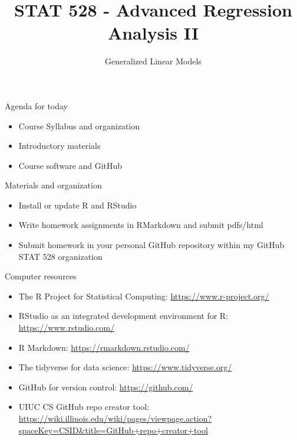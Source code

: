 \documentclass[
  ignorenonframetext,
]{beamer}
\title{STAT 528 - Advanced Regression Analysis II}
\author{Generalized Linear Models}
\date{}
\institute{Daniel J. Eck\\
Department of Statistics\\
University of Illinois}
\providecommand{\tightlist}{%
  \setlength{\itemsep}{0pt}\setlength{\parskip}{0pt}}
\begin{document}
\frame{\titlepage}

\begin{frame}
\newcommand{\R}{\mathbb{R}}
\newcommand{\Prob}{\mathbb{P}}
\newcommand{\Proj}{\textbf{P}}
\newcommand{\Hcal}{\mathcal{H}}
\newcommand{\rootn}{\sqrt{n}}
\newcommand{\p}{\mathbf{p}}
\newcommand{\E}{\text{E}}
\newcommand{\Var}{\text{Var}}
\newcommand{\Cov}{\text{Cov}}
\end{frame}

\begin{frame}{Agenda for today}
\protect\hypertarget{agenda-for-today}{}
\begin{itemize}
\tightlist
\item
  Course Syllabus and organization
\item
  Introductory materials
\item
  Course software and GitHub
\end{itemize}
\end{frame}

\begin{frame}{Materials and organization}
\protect\hypertarget{materials-and-organization}{}
\begin{itemize}
\tightlist
\item
  Install or update R and RStudio
\item
  Write homework assignments in RMarkdown and submit pdfs/html
\item
  Submit homework in your personal GitHub repository within my GitHub
  STAT 528 organization
\end{itemize}
\end{frame}

\begin{frame}{Computer resources}
\protect\hypertarget{computer-resources}{}
\begin{itemize}
\item
  The R Project for Statistical Computing:
  \url{https://www.r-project.org/}
\item
  RStudio as an integrated development environment for R:
  \url{https://www.rstudio.com/}
\item
  R Markdown: \url{https://rmarkdown.rstudio.com/}
\item
  The tidyverse for data science: \url{https://www.tidyverse.org/}
\item
  GitHub for version control: \url{https://github.com/}
\item
  UIUC CS GitHub repo creator tool:
  \url{https://wiki.illinois.edu/wiki/pages/viewpage.action?spaceKey=CSID&title=GitHub+repo+creator+tool}
\end{itemize}
\end{frame}
\end{document}
